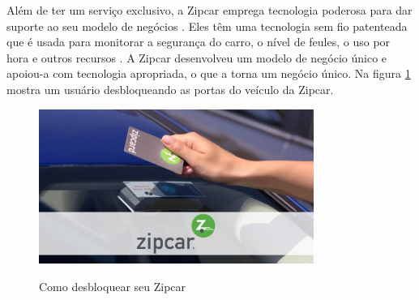Além de ter um serviço exclusivo, a Zipcar emprega tecnologia poderosa para dar suporte ao seu modelo de negócios \cite{pearlson2009strategic}. Eles têm uma tecnologia sem fio patenteada que é usada para monitorar a segurança do carro, o nível de feules, o uso por hora e outros recursos \cite{pearlson2009strategic}. A Zipcar desenvolveu um modelo de negócio único e apoiou-a com tecnologia apropriada, o que a torna um negócio único. Na figura \ref{fig:zipcar} mostra um usuário desbloqueando as portas do veículo da Zipcar.

\begin{figure}[!hbtp]
	\centering
	\caption{Como desbloquear seu Zipcar}
	\includegraphics[width=0.8\textwidth]{./04-figuras/zipcar/zipcar.jpg}
	\label{fig:zipcar}
\end{figure}




